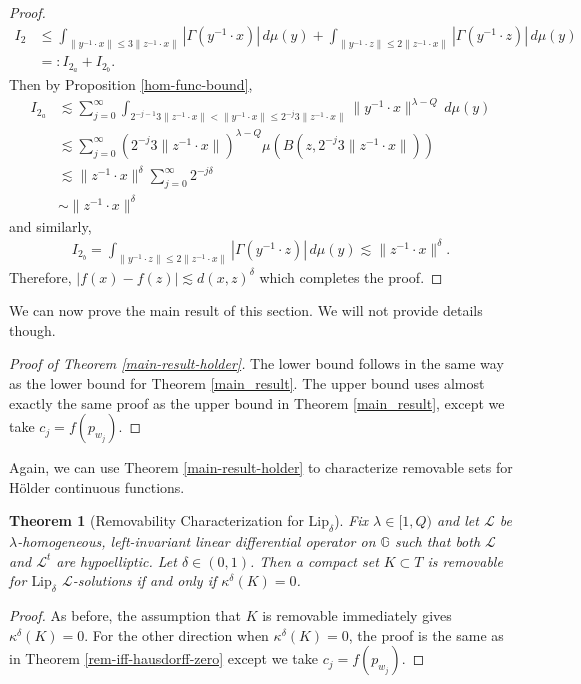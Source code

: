 \documentclass[12pt,a4paper,reqno]{amsart}
\newcommand{\cg}{\Gamma}
\renewcommand{\L}{\mathcal{L}}
\renewcommand{\k}{\kappa}
\renewcommand{\l}{\lambda}
\newcommand{\G}{\mathbb{G}}
\numberwithin{equation}{section}
\newtheorem{thm}{Theorem}[section]
\theoremstyle{definition}
\begin{document}
\begin{proof}
\begin{align*}
    I_2 &\leq \int_{\|y^{-1} \cdot x\| \leq 3\|z^{-1} \cdot x\|} |\cg(y^{-1} \cdot x)|\,d\mu(y) + \int_{\| y^{-1} \cdot z\| \leq 2\|z^{-1} \cdot x\|} |\cg(y^{-1} \cdot z)|\,d\mu(y) \\ &=: I_{2_a} + I_{2_b}.
\end{align*}
Then by Proposition \ref{hom-func-bound}, \begin{align*}
    I_{2_a} &\lesssim \sum_{j=0}^{\infty}\int_{ 2^{-j-1}3\|z^{-1} \cdot x\| <\| y^{-1} \cdot x\| \leq 2^{-j} 3\|z^{-1} \cdot x\|} \| y^{-1} \cdot x\|^{\l - Q}\,d\mu(y) \\ &\lesssim \sum_{j=0}^{\infty} (2^{-j} 3 \| z^{-1} \cdot x\|)^{\l - Q} \mu(B(z, 2^{-j} 3 \| z^{-1} \cdot x\|)) \\ &\lesssim \| z^{-1} \cdot x\|^{\delta} \sum_{j=0}^{\infty} 2^{-j \delta} \\ &\sim \| z^{-1} \cdot x\|^{\delta}
\end{align*}
and similarly, \begin{align*}
   I_{2_b} =\int_{\| y^{-1} \cdot z\| \leq 2\|z^{-1} \cdot x\|} |\cg(y^{-1} \cdot z)|\,d\mu(y) \lesssim \|z^{-1} \cdot x\|^{\delta}.
\end{align*}
Therefore, $|f(x) - f(z)| \lesssim d(x,z)^{\delta}$ which completes the proof.
\end{proof}
We can now prove the main result of this section. We will not provide details though.
\begin{proof}[Proof of Theorem \ref{main-result-holder}]
The lower bound follows in the same way as the lower bound for Theorem \ref{main_result}. The upper bound uses almost exactly the same proof as the upper bound in Theorem \ref{main_result}, except we take $c_j = f(p_{w_j})$.
\end{proof}
Again, we can use Theorem \ref{main-result-holder} to characterize removable sets for H\"{o}lder continuous functions. 

\begin{thm}[Removability Characterization for $\text{Lip}_{\delta}$]
Fix $\l \in [1,Q)$ and let $\L$ be $\l$-homogeneous, left-invariant linear differential operator on $\G$ such that both $\L$ and $\L^t$ are hypoelliptic. Let $\delta \in (0,1)$. Then a compact set $K \subset T$ is removable for $\text{Lip}_{\delta}$ $\L$-solutions if and only if $\k^{\delta}(K) = 0$.     
\end{thm}
\begin{proof}
As before, the assumption that $K$ is removable immediately gives $\k^{\delta}(K) = 0$. For the other direction when $\k^{\delta}(K) = 0$, the proof is the same as in Theorem \ref{rem-iff-hausdorff-zero} except we take $c_j = f(p_{w_j})$.
\end{proof}
\end{document}
